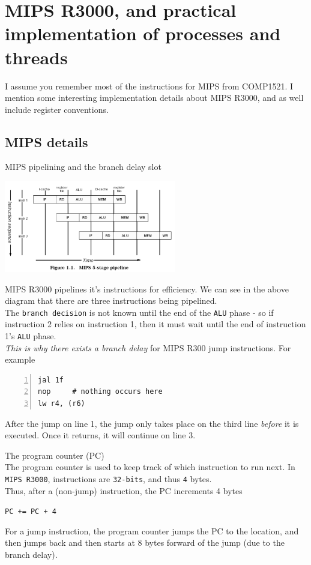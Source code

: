 \documentclass[journal, letterpaper]{IEEEtran}
\begin{document}
\section{MIPS R3000, and practical implementation of processes and threads}
I assume you remember most of the instructions for MIPS from COMP1521. I mention some interesting implementation details about MIPS R3000, and as well include register conventions.
\subsection{MIPS details}
\begin{aside}{MIPS pipelining and the branch delay slot}
    \begin{center}
        \includegraphics[width=7.5cm]{./photos/mips_pipeline.png}
    \end{center}
    MIPS R3000 pipelines it's instructions for efficiency. We can see in the above diagram that there are three instructions being pipelined. 
    \newline \\ 
    The \verb|branch decision| is not known until the end of the \verb|ALU| phase - so if instruction 2 relies on instruction 1, then it must wait until the end of instruction 1's \verb|ALU| phase.
    \newline \\
    \textit{This is why there exists a branch delay} for MIPS R300 jump instructions. For example
    \begin{Verbatim}[numbers=left, numbersep=2mm, frame=single]
jal 1f
nop     # nothing occurs here
lw r4, (r6)
    \end{Verbatim}
    After the jump on line 1, the jump only takes place on the third line \textit{before} it is executed. Once it returns, it will continue on line 3.
\end{aside}
\begin{aside}{The program counter (PC)} \\ 
    The program counter is used to keep track of which instruction to run next. In \verb|MIPS R3000|, instructions are \verb|32-bits|, and thus \verb|4| bytes. 
    \newline \\ 
    Thus, after a (non-jump) instruction, the PC increments 4 bytes
    \begin{center}
        \verb|PC += PC + 4|
    \end{center}
    For a jump instruction, the program counter jumps the PC to the location, and then jumps back 
    and then starts at 8 bytes forward of the jump (due to the branch delay).
\end{aside}
\end{document}
